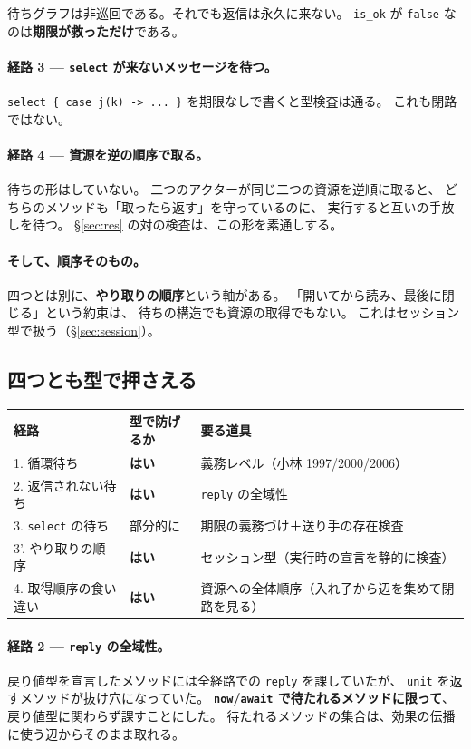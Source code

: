 \documentclass[11pt,a4paper]{ltjsarticle}
\theoremstyle{definition}
\theoremstyle{remark}
\begin{document}
待ちグラフは非巡回である。それでも返信は永久に来ない。
\texttt{is\_ok} が \texttt{false} なのは\textbf{期限が救っただけ}である。

\paragraph{経路 3 --- \texttt{select} が来ないメッセージを待つ。}
\texttt{select \{ case j(k) -> ... \}} を期限なしで書くと型検査は通る。
これも閉路ではない。

\paragraph{経路 4 --- 資源を逆の順序で取る。}
待ちの形はしていない。
二つのアクターが同じ二つの資源を逆順に取ると、
どちらのメソッドも「取ったら返す」を守っているのに、
実行すると互いの手放しを待つ。
\S\ref{sec:res} の対の検査は、この形を素通しする。

\paragraph{そして、順序そのもの。}
四つとは別に、\textbf{やり取りの順序}という軸がある。
「開いてから読み、最後に閉じる」という約束は、
待ちの構造でも資源の取得でもない。
これはセッション型で扱う（\S\ref{sec:session}）。

\subsection{四つとも型で押さえる}


\begin{center}
\begin{tabular}{lll}
\toprule
経路 & 型で防げるか & 要る道具 \\
\midrule
1. 循環待ち & \textbf{はい} & 義務レベル（小林 1997/2000/2006） \\
2. 返信されない待ち & \textbf{はい} & \texttt{reply} の全域性 \\
3. \texttt{select} の待ち & 部分的に & 期限の義務づけ＋送り手の存在検査 \\
3'. やり取りの順序 & \textbf{はい} & セッション型（実行時の宣言を静的に検査） \\
4. 取得順序の食い違い & \textbf{はい} & 資源への全体順序（入れ子から辺を集めて閉路を見る） \\
\bottomrule
\end{tabular}
\end{center}

\paragraph{経路 2 --- \texttt{reply} の全域性。}
戻り値型を宣言したメソッドには全経路での \texttt{reply} を課していたが、
\texttt{unit} を返すメソッドが抜け穴になっていた。
\textbf{\texttt{now}/\texttt{await} で待たれるメソッドに限って}、
戻り値型に関わらず課すことにした。
待たれるメソッドの集合は、効果の伝播に使う辺からそのまま取れる。
\end{document}
